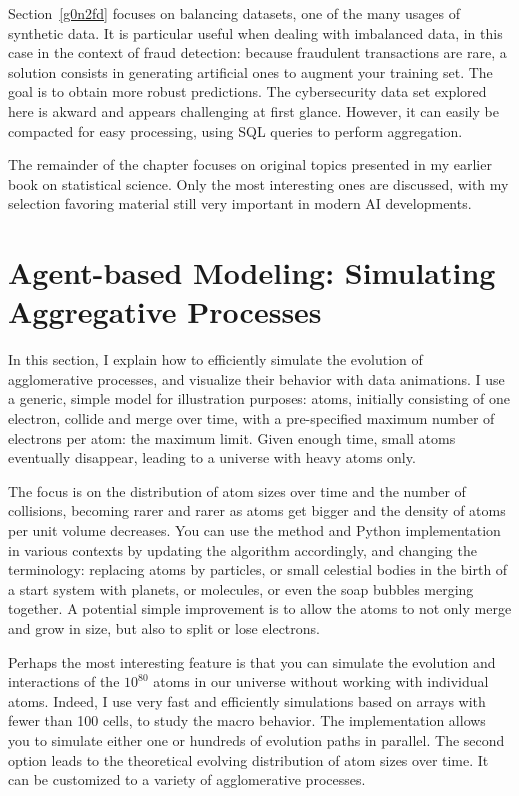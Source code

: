 \documentclass[oneside,10pt]{book}
\begin{document}
Section~\ref{g0n2fd} focuses on balancing datasets, one of the many usages of synthetic data. It is particular useful when dealing
 with imbalanced data, in this case in the context of fraud detection: because fraudulent transactions are rare, a solution consists in generating
 artificial ones to augment your training set. The goal is to obtain more robust predictions. The cybersecurity data set explored here is akward and appears challenging at first glance.
 However, it can easily be compacted for easy processing, using SQL queries to perform aggregation.

The remainder of the chapter focuses on original topics presented in my earlier book on statistical science. Only the most interesting ones
 are discussed, with my selection favoring material still very important in modern AI developments.

\section{Agent-based Modeling:  Simulating Aggregative Processes}\label{cfd43wpo}

In this section, I explain how to efficiently simulate the evolution of agglomerative processes, and visualize their behavior
 with data animations. I use a generic, simple model for illustration purposes: atoms, initially consisting of one electron, collide and merge over time, with a pre-specified maximum number of electrons per atom: the maximum limit. Given enough time, small atoms eventually disappear, leading to a universe with heavy atoms only.

The focus is on the distribution of atom sizes over time and the number of collisions, becoming rarer and rarer as atoms get bigger and the density of atoms per unit volume decreases.  You can use the method and Python implementation in various contexts by updating the algorithm accordingly, and changing the terminology: replacing atoms by particles, or small celestial bodies in the birth of a  start system with planets, or molecules, or even the soap bubbles merging together. A potential simple improvement is to allow the atoms to not only merge and grow in size, but also to split or lose electrons.

Perhaps the most interesting feature is that you can simulate the evolution and interactions of the $10^{80}$ atoms in our universe  without working with individual atoms. Indeed, I use very fast and efficiently simulations based on arrays with fewer than 100 cells, to study the macro behavior. The implementation allows you to simulate either one or hundreds of evolution paths in parallel. The second option leads to the theoretical evolving distribution of atom sizes over time.
 It can be customized to a variety of agglomerative processes.
\end{document}
